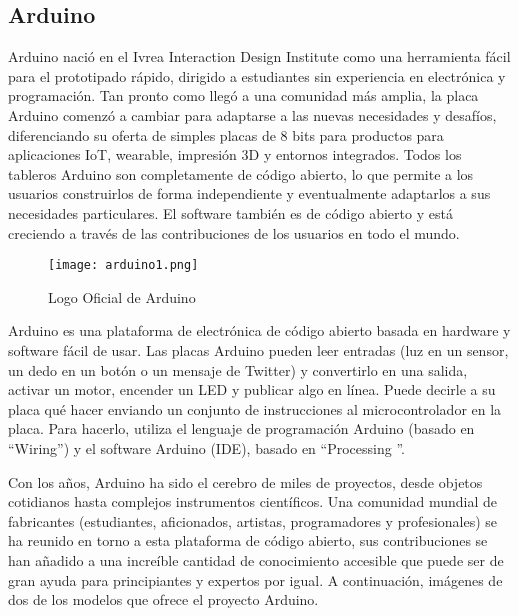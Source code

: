 \subsection{Arduino}

\par \noindent
Arduino nació en el Ivrea Interaction Design Institute como una herramienta fácil para el prototipado rápido, dirigido a estudiantes sin experiencia en electrónica y programación. Tan pronto como llegó a una comunidad más amplia, la placa Arduino comenzó a cambiar para adaptarse a las nuevas necesidades y desafíos, diferenciando su oferta de simples placas de 8 bits para productos para aplicaciones IoT, wearable, impresión 3D y entornos integrados. Todos los tableros Arduino son completamente de código abierto, lo que permite a los usuarios construirlos de forma independiente y eventualmente adaptarlos a sus necesidades particulares. El software también es de código abierto y está creciendo a través de las contribuciones de los usuarios en todo el mundo\cite{arduino-intro}.

\begin{figure}[H]
	\centering
	\texttt{[image: arduino1.png]}
	\caption{Logo Oficial de Arduino}
\end{figure}

\par
Arduino es una plataforma de electrónica de código abierto basada en hardware y software fácil de usar. Las placas Arduino pueden leer entradas (luz en un sensor, un dedo en un botón o un mensaje de Twitter) y convertirlo en una salida, activar un motor, encender un LED y publicar algo en línea. Puede decirle a su placa qué hacer enviando un conjunto de instrucciones al microcontrolador en la placa. Para hacerlo, utiliza el lenguaje de programación Arduino (basado en \textquotedblleft Wiring\textquotedblright) y el software Arduino (IDE), basado en \textquotedblleft Processing \textquotedblright\cite{arduino-intro}.

\par \noindent
Con los años, Arduino ha sido el cerebro de miles de proyectos, desde objetos cotidianos hasta complejos instrumentos científicos. Una comunidad mundial de fabricantes (estudiantes, aficionados, artistas, programadores y profesionales) se ha reunido en torno a esta plataforma de código abierto, sus contribuciones se han añadido a una increíble cantidad de conocimiento accesible que puede ser de gran ayuda para principiantes y expertos por igual\cite{arduino-intro}. A continuación, imágenes de dos de los modelos que ofrece el proyecto Arduino.

